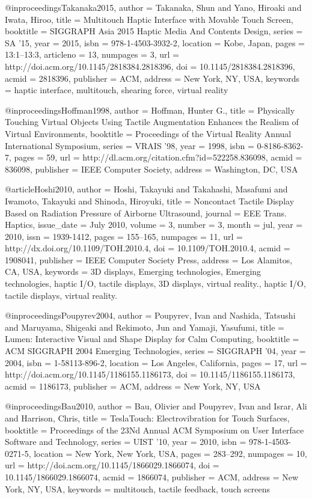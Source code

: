 @inproceedings{Takanaka2015,
 author = {Takanaka, Shun and Yano, Hiroaki and Iwata, Hiroo},
 title = {{Multitouch Haptic Interface with Movable Touch Screen}},
 booktitle = {SIGGRAPH Asia 2015 Haptic Media And Contents Design},
 series = {SA '15},
 year = {2015},
 isbn = {978-1-4503-3932-2},
 location = {Kobe, Japan},
 pages = {13:1--13:3},
 articleno = {13},
 numpages = {3},
 url = {http://doi.acm.org/10.1145/2818384.2818396},
 doi = {10.1145/2818384.2818396},
 acmid = {2818396},
 publisher = {ACM},
 address = {New York, NY, USA},
 keywords = {haptic interface, multitouch, shearing force, virtual reality}
} 

@inproceedings{Hoffman1998,
 author = {Hoffman, Hunter G.},
 title = {{Physically Touching Virtual Objects Using Tactile Augmentation Enhances the Realism of Virtual Environments}},
 booktitle = {Proceedings of the Virtual Reality Annual International Symposium},
 series = {VRAIS '98},
 year = {1998},
 isbn = {0-8186-8362-7},
 pages = {59},
 url = {http://dl.acm.org/citation.cfm?id=522258.836098},
 acmid = {836098},
 publisher = {IEEE Computer Society},
 address = {Washington, DC, USA}
} 

@article{Hoshi2010,
 author = {Hoshi, Takayuki and Takahashi, Masafumi and Iwamoto, Takayuki and Shinoda, Hiroyuki},
 title = {{Noncontact Tactile Display Based on Radiation Pressure of Airborne Ultrasound}},
 journal = {EEE Trans. Haptics},
 issue_date = {July 2010},
 volume = {3},
 number = {3},
 month = jul,
 year = {2010},
 issn = {1939-1412},
 pages = {155--165},
 numpages = {11},
 url = {http://dx.doi.org/10.1109/TOH.2010.4},
 doi = {10.1109/TOH.2010.4},
 acmid = {1908041},
 publisher = {IEEE Computer Society Press},
 address = {Los Alamitos, CA, USA},
 keywords = {3D displays, Emerging technologies, Emerging technologies, haptic I/O, tactile displays, 3D displays, virtual reality., haptic I/O, tactile displays, virtual reality.}
} 

@inproceedings{Poupyrev2004,
 author = {Poupyrev, Ivan and Nashida, Tatsushi and Maruyama, Shigeaki and Rekimoto, Jun and Yamaji, Yasufumi},
 title = {{Lumen: Interactive Visual and Shape Display for Calm Computing}},
 booktitle = {ACM SIGGRAPH 2004 Emerging Technologies},
 series = {SIGGRAPH '04},
 year = {2004},
 isbn = {1-58113-896-2},
 location = {Los Angeles, California},
 pages = {17},
 url = {http://doi.acm.org/10.1145/1186155.1186173},
 doi = {10.1145/1186155.1186173},
 acmid = {1186173},
 publisher = {ACM},
 address = {New York, NY, USA}
} 

@inproceedings{Bau2010,
 author = {Bau, Olivier and Poupyrev, Ivan and Israr, Ali and Harrison, Chris},
 title = {{TeslaTouch: Electrovibration for Touch Surfaces}},
 booktitle = {Proceedings of the 23Nd Annual ACM Symposium on User Interface Software and Technology},
 series = {UIST '10},
 year = {2010},
 isbn = {978-1-4503-0271-5},
 location = {New York, New York, USA},
 pages = {283--292},
 numpages = {10},
 url = {http://doi.acm.org/10.1145/1866029.1866074},
 doi = {10.1145/1866029.1866074},
 acmid = {1866074},
 publisher = {ACM},
 address = {New York, NY, USA},
 keywords = {multitouch, tactile feedback, touch screens}
} 

